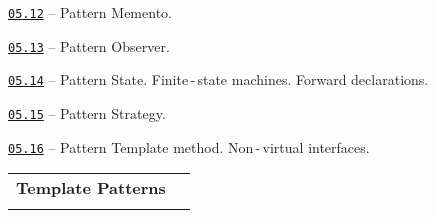 \documentclass[a4paper,12pt]{article}
\renewenvironment{itemize}
{
    \begin{list}{\labelitemi}
    {
      \setlength{\topsep}{0pt}
      \setlength{\partopsep}{0pt}
      \setlength{\parskip}{0pt}
      \setlength{\itemsep}{0pt}
      \setlength{\parsep}{0pt}
      \setlength{\leftmargin}{14.5pt}
    }
}{\end{list}}
\begin{document}
\medskip\smallskip

\begin{itemize}

    \item \href{https://github.com/i-s-m-mipt/Education/blob/master/projects/examples/source/05.12.cpp}{\texttt{05.12}} -- Pattern Memento.

    \smallskip

    \item \href{https://github.com/i-s-m-mipt/Education/blob/master/projects/examples/source/05.13.cpp}{\texttt{05.13}} -- Pattern Observer.

    \smallskip

    \item \href{https://github.com/i-s-m-mipt/Education/blob/master/projects/examples/source/05.14.cpp}{\texttt{05.14}} -- Pattern State. Finite\,-\,state machines. Forward declarations.

    \smallskip

    \item \href{https://github.com/i-s-m-mipt/Education/blob/master/projects/examples/source/05.15.cpp}{\texttt{05.15}} -- Pattern Strategy.

    \smallskip

    \item \href{https://github.com/i-s-m-mipt/Education/blob/master/projects/examples/source/05.16.cpp}{\texttt{05.16}} -- Pattern Template method. Non\,-\,virtual interfaces.

\end{itemize}

\bigskip\medskip

\begin{tabular}{!{\vrule width 1pt}L{3.7cm}!{\vrule width 1pt}L{15.3cm}!{\vrule width 0pt}} 


\textbf{Template Patterns} & \\


\end{tabular}

\medskip\smallskip
\end{document}
